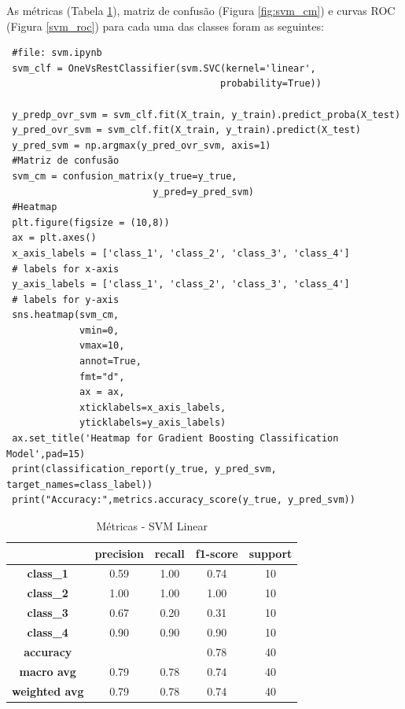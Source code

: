 \documentclass[
	article,			%
	11pt,				%
	oneside,			%
	a4paper,			%
	english,			%
	brazil,				%
	sumario=tradicional
	]{abntex2}
\begin{document}
As métricas (Tabela \ref{tab:svm_01}), matriz de confusão (Figura \ref{fig:svm_cm}) e curvas ROC (Figura \ref{svm_roc}) para cada uma das classes foram as seguintes:

\begin{verbatim}
 #file: svm.ipynb
 svm_clf = OneVsRestClassifier(svm.SVC(kernel='linear',
                                      probability=True))

 y_predp_ovr_svm = svm_clf.fit(X_train, y_train).predict_proba(X_test)
 y_pred_ovr_svm = svm_clf.fit(X_train, y_train).predict(X_test)
 y_pred_svm = np.argmax(y_pred_ovr_svm, axis=1)
 #Matriz de confusão
 svm_cm = confusion_matrix(y_true=y_true, 
                          y_pred=y_pred_svm)
 #Heatmap
 plt.figure(figsize = (10,8))
 ax = plt.axes()
 x_axis_labels = ['class_1', 'class_2', 'class_3', 'class_4'] 
 # labels for x-axis
 y_axis_labels = ['class_1', 'class_2', 'class_3', 'class_4'] 
 # labels for y-axis
 sns.heatmap(svm_cm,
             vmin=0,
             vmax=10,
             annot=True,
             fmt="d",
             ax = ax,
             xticklabels=x_axis_labels, 
             yticklabels=y_axis_labels)
 ax.set_title('Heatmap for Gradient Boosting Classification Model',pad=15)
 print(classification_report(y_true, y_pred_svm, target_names=class_label))
 print("Accuracy:",metrics.accuracy_score(y_true, y_pred_svm))
\end{verbatim}


\begin{table}[H]
\centering
\begin{tabular}{c|c|c|c|c|}
\cline{2-5}
                                            & \textbf{precision} & \textbf{recall} & \textbf{f1-score} & \textbf{support} \\ \hline
\multicolumn{1}{|c|}{\textbf{class\_1}}     & 0.59               & 1.00            & 0.74              & 10               \\ \hline
\multicolumn{1}{|c|}{\textbf{class\_2}}     & 1.00               & 1.00            & 1.00              & 10               \\ \hline
\multicolumn{1}{|c|}{\textbf{class\_3}}     & 0.67               & 0.20            & 0.31              & 10               \\ \hline
\multicolumn{1}{|c|}{\textbf{class\_4}}     & 0.90               & 0.90            & 0.90              & 10               \\ \hline
\multicolumn{1}{|c|}{\textbf{accuracy}}     &                    &                 & 0.78              & 40               \\ \hline
\multicolumn{1}{|c|}{\textbf{macro avg}}    & 0.79               & 0.78            & 0.74              & 40               \\ \hline
\multicolumn{1}{|c|}{\textbf{weighted avg}} & 0.79               & 0.78            & 0.74              & 40               \\ \hline
\end{tabular}
\caption{Métricas - SVM Linear}
\label{tab:svm_01}
\end{table}
\end{document}
